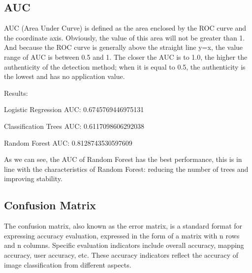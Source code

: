 \documentclass[11pt]{report}
\begin{document}
\subsection{AUC}

AUC (Area Under Curve) is defined as the area enclosed by the ROC curve and the coordinate axis. Obviously, the value of this area will not be greater than 1. And because the ROC curve is generally above the straight line y=x, the value range of AUC is between 0.5 and 1. The closer the AUC is to 1.0, the higher the authenticity of the detection method; when it is equal to 0.5, the authenticity is the lowest and has no application value.

Results:

Logistic Regression AUC: 0.6745769446975131

Classification Trees AUC: 0.6117098606292038

Random Forest AUC: 0.8128743530597609

As we can see, the AUC of Random Forest has the best performance, this is in line with the characteristics of Random Forest: reducing the number of trees and improving stability.

\subsection{Confusion Matrix}

The confusion matrix, also known as the error matrix, is a standard format for expressing accuracy evaluation, expressed in the form of a matrix with n rows and n columns. Specific evaluation indicators include overall accuracy, mapping accuracy, user accuracy, etc. These accuracy indicators reflect the accuracy of image classification from different aspects.
\end{document}
